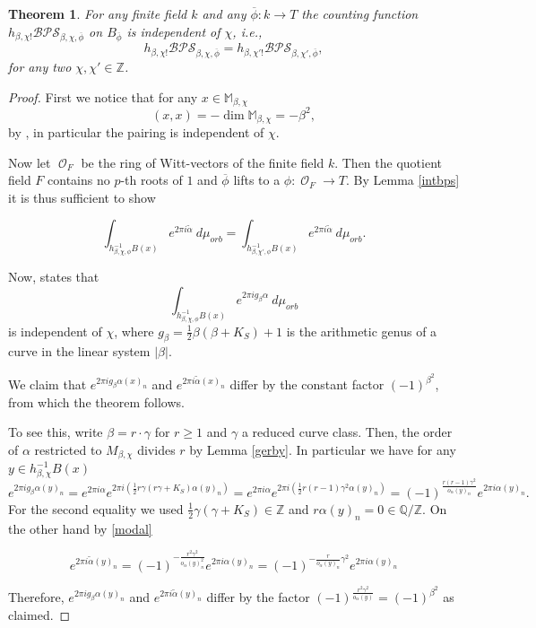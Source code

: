\documentclass{article}
\DeclareMathOperator{\Oo}{\mathcal{O}}
\newcommand{\BM}{{\mathbb{M}}}
\newcommand{\BQ}{{\mathbb{Q}}}
\newcommand{\BZ}{{\mathbb{Z}}}
\newcommand{\BPS}{\mathcal{BPS} }
\theoremstyle{definition}
\theoremstyle{plain}
\newtheorem{theorem}[definition]{Theorem}
\begin{document}
\begin{theorem}\label{thm:chi-ind}For any finite field $k$ and any $\overline{\phi}: k \to T$ the counting function $h_{\beta,\chi!}\BPS_{\beta,\chi,\overline{\phi}}$ on $B_{\overline{\phi}}$ is independent of $\chi$, i.e.,
\[h_{\beta,\chi!}\BPS_{\beta,\chi,\overline{\phi}} = h_{\beta,\chi'!}\BPS_{\beta,\chi',\overline{\phi}},  \]
for any two $\chi,\chi' \in \BZ$.    
\end{theorem}
\begin{proof} First we notice that for any $x \in \BM_{\beta,\chi}$ 
\[(x,x) = - \dim\BM_{\beta,\chi} = -\beta^2, \]
by \cite[Lemma 2.5]{MS20}, in particular the pairing is independent of $\chi$.

Now let $\Oo_F$ be the ring of Witt-vectors of the finite field $k$. Then the quotient field $F$ contains no $p$-th roots of $1$ and $\overline{\phi}$ lifts to a $\phi:\Oo_F \to T$. By Lemma \ref{intbps} it is thus sufficient to show 

\[\int_{h_{\beta,\chi,\phi}^{-1}B(x)} e^{2\pi i\tilde{\alpha}} \ d\mu_{orb} = \int_{h_{\beta,\chi',\phi}^{-1}B(x)} e^{2\pi i\tilde{\alpha}} \ d\mu_{orb}.  \]

Now, \cite[Theorem 1.2.2]{COW21} states that \[\int_{h_{\beta,\chi,\phi}^{-1}B(x)} e^{2\pi i g_\beta\alpha} \ d\mu_{orb}\]
is independent of $\chi$, where $g_\beta = \frac{1}{2} \beta(\beta +K_S) +1$ is the arithmetic genus of a curve in the linear system $|\beta|$. 

We claim that $e^{2\pi i g_\beta \alpha(x)_n}$ and $e^{2\pi i\tilde{\alpha}(x)_n}$ differ by the constant factor $(-1)^{\beta^2}$, from which the theorem follows.

To see this, write $\beta = r \cdot \gamma$ for $r \geq 1$ and $\gamma$ a reduced curve class. Then, the order of $\alpha$ restricted to $M_{\beta,\chi}$ divides $r$ by Lemma \ref{gerby}. In particular we have for any $y \in h_{\beta,\chi}^{-1}B(x)$
\[e^{2\pi i g_\beta \alpha(y)_n}= e^{2\pi i \alpha} e^{2\pi i \left(\frac{1}{2} r\gamma(r\gamma +K_S)\alpha(y)_n\right)} = e^{2\pi i \alpha} e^{2\pi i \left(\frac{1}{2} r(r-1)\gamma^2\alpha(y)_n\right)}= (-1)^{\frac{r(r-1) \gamma^2}{o_\alpha(y)_n}} e^{2\pi i \alpha(y)_n}. \]
For the second equality we used $\frac{1}{2} \gamma (\gamma +K_S) \in \BZ$ and $r \alpha(y)_n = 0 \in \BQ/\BZ$.
On the other hand by \eqref{modal}

\[e^{2\pi i\tilde{\alpha}(y)_n} = (-1)^{-\frac{r^2\gamma^2}{o_\alpha(y)_n^2}}e^{2\pi i \alpha(y)_n} = (-1)^{-\frac{r}{o_\alpha(y)_n}\gamma^2}e^{2\pi i \alpha(y)_n}   \]

Therefore, $e^{2\pi i g_\beta \alpha(y)_n}$ and $e^{2\pi i\tilde{\alpha}(y)_n}$ differ by the factor $(-1)^{\frac{r^2 \gamma^2}{o_\alpha(y)}} = (-1)^{\beta^2}$ as claimed.
\end{proof}
\end{document}
